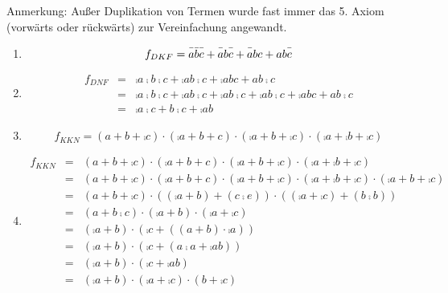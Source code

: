 \documentclass{CInf_practice}
\begin{document}
\cinftitle

Anmerkung: Außer Duplikation von Termen wurde fast immer das 5. Axiom (vorwärts
oder rückwärts) zur Vereinfachung angewandt.

\begin{enumerate}[label=\alph{*})]
   \item
      \begin{equation*}
         f_{DKF} = \comp a\comp b \comp c + \comp a b\comp c + \comp a b c + 
         a b\comp c \\
      \end{equation*}
   \item
      \begin{eqnarray*}
         f_{DNF} & = & \comp a\comp b \comp c + \comp a b\comp c + \comp a b c + 
         a b\comp c \\
                 & = & \comp a \comp b \comp c + \comp a b \comp c + \comp a b
                       \comp c + \comp a b \comp c + \comp a b c + a b \comp c \\
                 & = & \comp a \comp c + b \comp c + \comp a b
      \end{eqnarray*}
   \item
      \begin{equation*}
         f_{KKN} = (a + b + \comp c) \cdot (\comp a + b + c) \cdot (\comp a
         + b  +\comp c) \cdot (\comp a + \comp b  +\comp c)
      \end{equation*}
   \item
      \begin{eqnarray*}
         f_{KKN} & = & (a + b + \comp c) \cdot (\comp a + b + c) \cdot (\comp a + b  +\comp c) \cdot (\comp a + \comp b  +\comp c) \\
                 & = & (a + b + \comp c) \cdot (\comp a + b + c) \cdot (\comp a
                        + b  +\comp c) \cdot (\comp a + \comp b  +\comp c) \cdot (\comp a + b + \comp c)\\
                 & = & (a + b + \comp c) \cdot ((\comp a + b) + (c\comp e)) \cdot ((\comp a + \comp c) + (b\comp b)) \\
                 & = & (a + b \comp c) \cdot (\comp a + b) \cdot (\comp a + \comp c) \\
                 & = & (\comp a + b) \cdot (\comp c + ((a + b)\cdot\comp a)) \\
                 & = & (\comp a + b) \cdot (\comp c + (a\comp a + \comp a b)) \\
                 & = & (\comp a + b) \cdot (\comp c + \comp a b) \\
                 & = & (\comp a + b) \cdot (\comp a + \comp c) \cdot (b + \comp c)
      \end{eqnarray*}


\end{enumerate}
\end{document}
